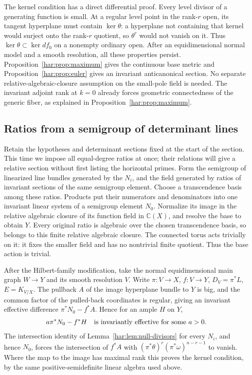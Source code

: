 The kernel condition has a direct differential proof. Every level
divisor of a generating function is small. At a regular level point
in the rank-\(r\) open, its tangent hyperplane must contain
\(\ker\theta\): a hyperplane not containing that kernel would surject
onto the rank-\(r\) quotient, so \(\theta^r\) would not vanish on it.
Thus \(\ker\theta\subset\ker df_0\) on a nonempty ordinary open.
After an equidimensional normal model and a smooth resolution, all
these properties persist. Proposition~\ref{har:prop:maximum} gives the
continuous base metric and Proposition~\ref{har:prop:euler} gives an
invariant anticanonical section. No separate relative-algebraic-closure
assumption on the small-pole field is needed. The invariant adjoint
rank at \(k=0\) already forces geometric connectedness of the generic
fiber, as explained in Proposition~\ref{har:prop:maximum}.

\subsection{Ratios from a semigroup of determinant lines}\label{har:subsec:semigroup}

Retain the hypotheses and determinant sections fixed at the start of
the section. This time we impose all equal-degree ratios at once;
their relations will give a relative section without first listing
the horizontal primes. Form the semigroup of linearized line bundles generated by the
\(N_i\), and the field generated by ratios of invariant sections of
the same semigroup element. Choose a transcendence basis among these
ratios. Products put their numerators and denominators into one
invariant linear system of a semigroup element \(N_0\). Normalize its
image in the relative algebraic closure of its function field in
\(\mathbb C(X)\), and resolve the base to obtain \(Y\). Every original
ratio is algebraic over the chosen transcendence basis, so belongs
to this finite relative algebraic closure. The connected torus
acts trivially on it: it fixes the smaller field and has no nontrivial
finite quotient. Thus the base action is trivial.

After the Hilbert-family modification, take the normal equidimensional
main graph \(W\to Y\) and its smooth resolution \(V\). Write
\(\pi:V\to X\), \(f:V\to Y\), \(D_V=\pi^*L\), \(E=K_{V/X}\).
The pullback \(A\) of the image hyperplane bundle to \(Y\) is big,
and the common factor of the pulled-back coordinates is regular,
giving an invariant effective difference
\(\pi^*N_0-f^*A\). Hence for an ample \(H\) on \(Y\),
\begin{equation}\label{har:eq:absorb}
 a\pi^*N_0-f^*H\quad\hbox{is invariantly effective for some }a>0.
\end{equation}
The intersection identity of Lemma~\ref{har:lem:null-divisors} for
every \(N_i\), and hence \(N_0\), forces the intersection of \(f^*A\) with
\((\pi^*\theta)^r(\pi^*\omega)^{n-r-1}\) to vanish. Where the map to
the image has maximal rank this proves the kernel condition, by the
same positive-semidefinite linear algebra used above.


